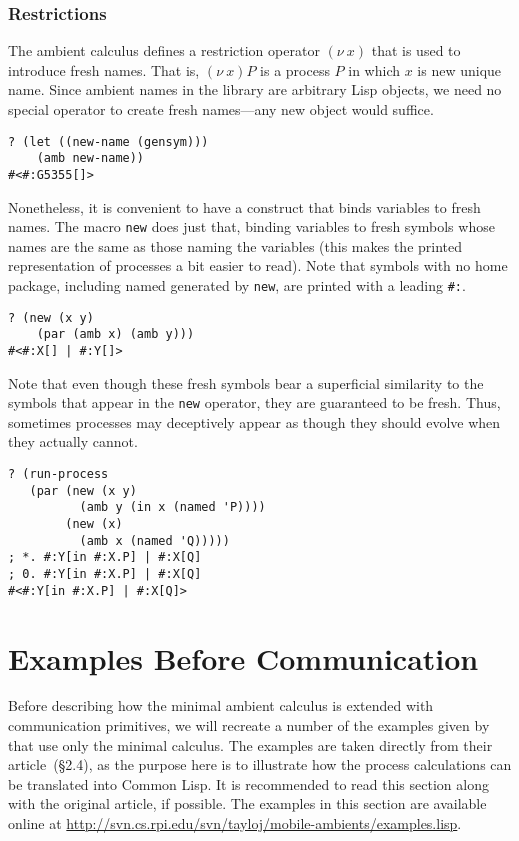 \documentclass[12pt]{article}
\begin{document}
\subsubsection{Restrictions}
\label{sec:restrictions}

The ambient calculus defines a restriction operator $(\nu\ x)$ that is used to introduce fresh names.
That is, $(\nu\ x)P$ is a process $P$ in which $x$ is new unique name.
Since ambient names in the library are arbitrary Lisp objects, we need no special operator to create fresh names---any new object would suffice.

\begin{verbatim}
? (let ((new-name (gensym)))
    (amb new-name))
#<#:G5355[]>
\end{verbatim}

Nonetheless, it is convenient to have a construct that binds variables to fresh names.
The macro \texttt{new} does just that, binding variables to fresh symbols whose names are the same as those naming the variables (this makes the printed representation of processes a bit easier to read).
Note that symbols with no home package, including named generated by \texttt{new}, are printed with a leading \texttt{\#:}.

\begin{verbatim}
? (new (x y)
    (par (amb x) (amb y)))
#<#:X[] | #:Y[]>
\end{verbatim}

Note that even though these fresh symbols bear a superficial similarity to the symbols that appear in the \texttt{new} operator, they are guaranteed to be fresh.
Thus, sometimes processes may deceptively appear as though they should evolve when they actually cannot.

\begin{verbatim}
? (run-process
   (par (new (x y)
          (amb y (in x (named 'P))))
        (new (x)
          (amb x (named 'Q)))))
; *. #:Y[in #:X.P] | #:X[Q]
; 0. #:Y[in #:X.P] | #:X[Q]
#<#:Y[in #:X.P] | #:X[Q]>
\end{verbatim}

\section{Examples Before Communication}
\label{sec:examples-before-communication}

Before describing how the minimal ambient calculus is extended with communication primitives, we will recreate a number of the examples given by  that use only the minimal calculus.
The examples are taken directly from their article~(\S2.4), as the purpose here is to illustrate how the process calculations can be translated into Common Lisp.
It is recommended to read this section along with the original article, if possible.
The examples in this section are available online at 
\href{http://svn.cs.rpi.edu/svn/tayloj/mobile-ambients/examples.lisp}{http://svn.cs.rpi.edu/svn/tayloj/mobile-ambients/examples.lisp}.
\end{document}

